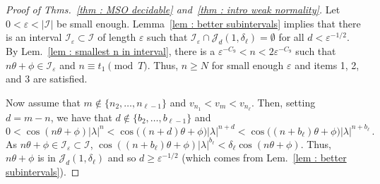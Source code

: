 \documentclass[a4paper,UKenglish,cleveref, autoref, thm-restate]{lipics-v2021}
\begin{document}
\begin{proof}[Proof of Thms.~\ref{thm : MSO decidable} and~\ref{thm : intro weak normality}]
    Let $0 < \varepsilon < |\mathcal{I}|$ be small enough.
    Lemma~\ref{lem : better subintervals} implies that there is an interval $\mathcal{I}_\varepsilon \subset \mathcal{I}$ of length $\varepsilon$ such that $\mathcal{I}_\varepsilon \cap \mathcal{J}_d(1, \delta_\ell) = \emptyset$ for all $d < \varepsilon^{-1/2}$.
    By Lem.~\ref{lem : smallest n in interval}, there is a $\varepsilon^{-C_9} < n < 2\varepsilon^{-C_9}$ such that $n\theta + \phi \in \mathcal{I}_\varepsilon$ and $n\equiv t_1 \pmod T$. 
    Thus, $n \ge N$ for small enough $\varepsilon$ and items 1, 2, and 3 are satisfied.
    

    Now assume that $m \not \in \{n_2,\dots,n_{\ell-1}\}$ and $v_{n_1} < v_m < v_{n_\ell}$. 
    Then, setting $d = m - n$, we have that $d \not\in \{b_2,\dots,b_{\ell-1}\}$ and 
    \begin{equation*}
        0 < \cos(n\theta + \phi)|\lambda|^n < \cos\big((n+d)\theta + \phi\big)|\lambda|^{n+d}  < \cos\big((n+b_\ell)\theta + \phi\big)|\lambda|^{n+b_\ell} \, .
    \end{equation*}
    As $n\theta + \phi \in \mathcal{I}_\varepsilon \subset \mathcal{I}$, $\cos((n+b_\ell)\theta + \phi)|\lambda|^{b_\ell} < \delta_\ell \cos(n\theta + \phi)$.
    Thus, $n\theta+\phi$ is in $\mathcal{J}_d(1, \delta_\ell)$ and so $d \ge \varepsilon^{-1/2}$ (which comes from Lem.~\ref{lem : better subintervals}).
    

\end{proof}
\end{document}
